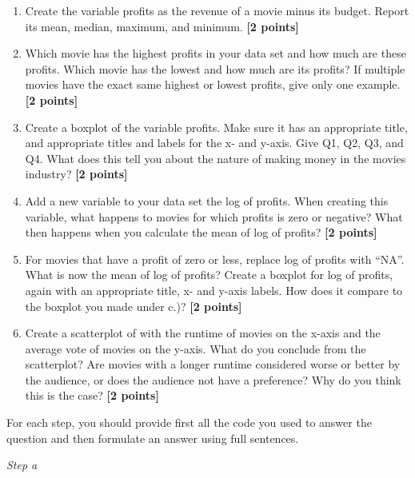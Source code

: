 \documentclass[
]{article}
\newenvironment{Shaded}{\begin{snugshade}}{\end{snugshade}}
\newcommand{\AttributeTok}[1]{\textcolor[rgb]{0.13,0.29,0.53}{#1}}
\newcommand{\ConstantTok}[1]{\textcolor[rgb]{0.56,0.35,0.01}{#1}}
\newcommand{\FunctionTok}[1]{\textcolor[rgb]{0.13,0.29,0.53}{\textbf{#1}}}
\newcommand{\NormalTok}[1]{#1}
\newcommand{\OtherTok}[1]{\textcolor[rgb]{0.56,0.35,0.01}{#1}}
\newcommand{\SpecialCharTok}[1]{\textcolor[rgb]{0.81,0.36,0.00}{\textbf{#1}}}
\newcommand{\StringTok}[1]{\textcolor[rgb]{0.31,0.60,0.02}{#1}}
\begin{document}
\begin{enumerate}
\def\labelenumi{\alph{enumi}.}
\item
  Create the variable profits as the revenue of a movie minus its
  budget. Report its mean, median, maximum, and minimum.
  \textbf{[2 points]}
\item
  Which movie has the highest profits in your data set and how much are
  these profits. Which movie has the lowest and how much are its
  profits? If multiple movies have the exact same highest or lowest
  profits, give only one example. \textbf{[2 points]}
\item
  Create a boxplot of the variable profits. Make sure it has an
  appropriate title, and appropriate titles and labels for the x- and
  y-axis. Give Q1, Q2, Q3, and Q4. What does this tell you about the
  nature of making money in the movies industry? \textbf{[2 points]}
\item
  Add a new variable to your data set the log of profits. When creating
  this variable, what happens to movies for which profits is zero or
  negative? What then happens when you calculate the mean of log of
  profits? \textbf{[2 points]}
\item
  For movies that have a profit of zero or less, replace log of profits
  with ``NA''. What is now the mean of log of profits? Create a boxplot
  for log of profits, again with an appropriate title, x- and y-axis
  labels. How does it compare to the boxplot you made under c.)?
  \textbf{[2 points]}
\item
  Create a scatterplot of with the runtime of movies on the x-axis and
  the average vote of movies on the y-axis. What do you conclude from
  the scatterplot? Are movies with a longer runtime considered worse or
  better by the audience, or does the audience not have a preference?
  Why do you think this is the case? \textbf{[2 points]}
\end{enumerate}

For each step, you should provide first all the code you used to answer
the question and then formulate an answer using full sentences.

\emph{Step a}

\begin{Shaded}
\end{Shaded}
\end{document}

